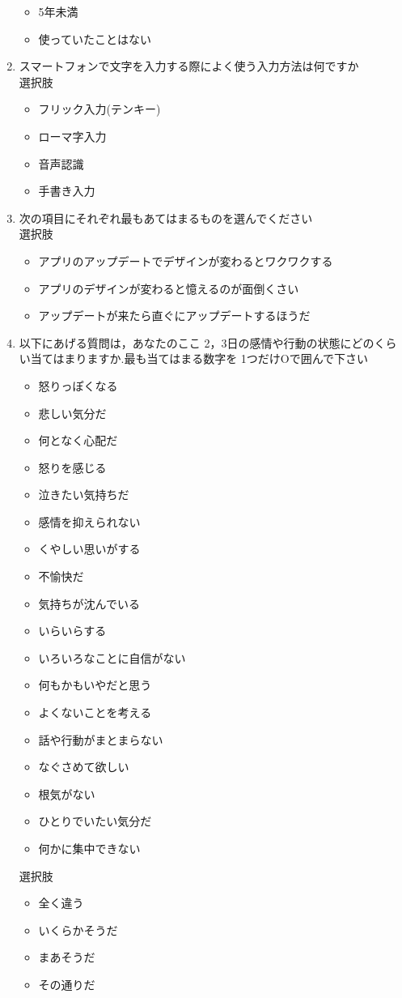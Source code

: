 \begin{enumerate}
\begin{itemize}
  \item 5年未満
  \item 使っていたことはない
\end{itemize}
\item スマートフォンで文字を入力する際によく使う入力方法は何ですか\\
選択肢
\begin{itemize}
  \item フリック入力(テンキー)
  \item ローマ字入力
  \item 音声認識
  \item 手書き入力
\end{itemize}
\item 次の項目にそれぞれ最もあてはまるものを選んでください\\
選択肢
\begin{itemize}
  \item アプリのアップデートでデザインが変わるとワクワクする
  \item アプリのデザインが変わると憶えるのが面倒くさい
  \item アップデートが来たら直ぐにアップデートするほうだ
\end{itemize}
\item 以下にあげる質問は，あなたのここ 2，3日の感情や行動の状態にどのくら い当てはまりますか.最も当てはまる数字を 1つだけOで囲んで下さい\\
\begin{itemize}
  \item 怒りっぽくなる
  \item 悲しい気分だ
  \item 何となく心配だ
  \item 怒りを感じる
  \item 泣きたい気持ちだ
  \item 感情を抑えられない
  \item くやしい思いがする
  \item 不愉快だ
  \item 気持ちが沈んでいる
  \item いらいらする
  \item いろいろなことに自信がない
  \item 何もかもいやだと思う
  \item よくないことを考える
  \item 話や行動がまとまらない
  \item なぐさめて欲しい
  \item 根気がない
  \item ひとりでいたい気分だ
  \item 何かに集中できない
  \end{itemize}
  選択肢
  \begin{itemize}
  \item 全く違う
  \item いくらかそうだ
  \item まあそうだ
  \item その通りだ
\end{itemize}



\end{enumerate}

